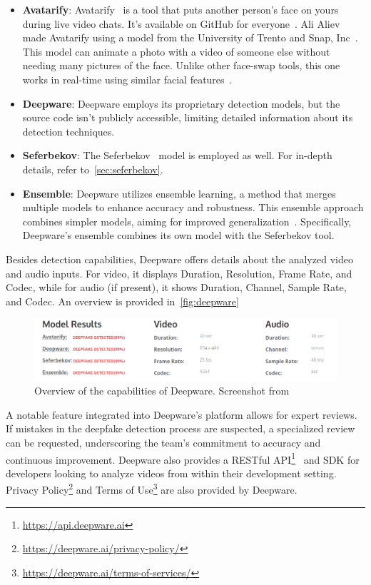 \begin{itemize}
	\item \textbf{Avatarify}: Avatarify~\cite{avatarify} is a tool that puts another person's
	      face on yours during live video chats. It's available on GitHub for everyone~\cite{avatarify-github}.
	      Ali Aliev made Avatarify using a model from the University of Trento and Snap, Inc~\cite{avatarify-vice,siarohin2020order}.
	      This model can animate a photo with a video of someone else without needing many
	      pictures of the face. Unlike other face-swap tools, this one works in real-time
	      using similar facial features~\cite{avatarify-thenextweb}.
	\item \textbf{Deepware}: Deepware employs its proprietary detection models, but the
	      source code isn't publicly accessible, limiting detailed information about
	      its detection techniques.
	\item \textbf{Seferbekov}: The Seferbekov~\cite{seferbekov-github} model is employed
	      as well. For in-depth details, refer to~\autoref{sec:seferbekov}.
	\item \textbf{Ensemble}: Deepware utilizes ensemble learning, a method that merges
	      multiple models to enhance accuracy and robustness. This ensemble approach
	      combines simpler models, aiming for improved generalization~\cite{giatsoglou2023investigation}. Specifically,
	      Deepware's ensemble combines its own model with the Seferbekov tool.
\end{itemize}

Besides detection capabilities, Deepware offers details about the analyzed video and audio
inputs. For video, it displays Duration, Resolution, Frame Rate, and Codec, while
for audio (if present), it shows Duration, Channel, Sample Rate, and Codec. An overview
is provided in~\autoref{fig:deepware}

\begin{figure}[htpb]
	\centering
	\includegraphics[scale=0.41]{figures/deepware}
	\caption{Overview of the capabilities of Deepware. Screenshot from~\cite{deepware-ai}}\label{fig:deepware}
\end{figure}

A notable feature integrated into Deepware's platform allows for expert
reviews. If mistakes in the deepfake detection process are suspected,
a specialized review can be requested, underscoring the team's commitment
to accuracy and continuous improvement. Deepware also provides a RESTful
\ac{API}\footnote{\url{https://api.deepware.ai}}~\cite{bernarddeepfake}
and \ac{SDK} for developers looking to analyze videos from within
their development setting. Privacy Policy\footnote{\url{https://deepware.ai/privacy-policy/}}
and Terms of Use\footnote{\url{https://deepware.ai/terms-of-services/}} are
also provided by Deepware.

